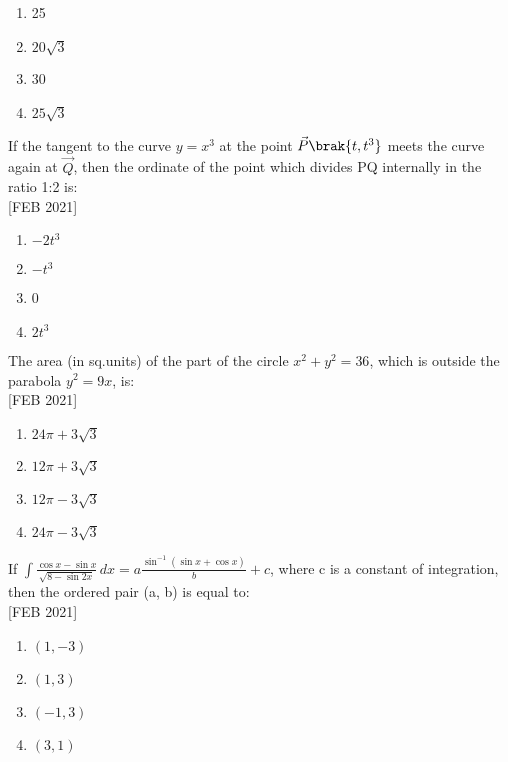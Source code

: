     \begin{multicols}{4}
    \begin{enumerate}
        \item 25
        \item $20\sqrt{3}$
        \item 30
        \item $25\sqrt{3}$
    \end{enumerate}
    \end{multicols}
    \item If the tangent to the curve $y = x^3$ at the point $\vec{P}\brak{t, t^3}$ meets the curve again at $\vec{Q}$, then the ordinate of the point which divides PQ internally in the ratio 1:2 is: \\\hfill{[FEB 2021]}
    \begin{multicols}{4}
    \begin{enumerate}
        \item $-2t^3$
        \item $-t^3$
        \item 0
        \item $2t^3$
    \end{enumerate}
    \end{multicols}
    \item The area (in sq.units) of the part of the circle $x^2 + y^2 = 36$, which is outside the parabola $y^2 = 9x$, is: \\\hfill{[FEB 2021]}
    \begin{multicols}{4}
    \begin{enumerate}
        \item $24\pi + 3\sqrt{3}$
        \item $12\pi + 3\sqrt{3}$
        \item $12\pi - 3\sqrt{3}$
        \item $24\pi - 3\sqrt{3}$
    \end{enumerate}
    \end{multicols}
    \item If $\int \frac{\cos x - \sin x}{\sqrt{8 - \sin 2x}} \, dx = a \frac{\sin^{-1}(\sin x + \cos x)}{b} + c$, where c is a constant of integration, then the ordered pair (a, b) is equal to: \\\hfill{[FEB 2021]}
    \begin{multicols}{4}
    \begin{enumerate}
        \item $(1,-3)$
        \item $(1,3)$
        \item $(-1,3)$
        \item $(3,1)$
    \end{enumerate}
    \end{multicols}
